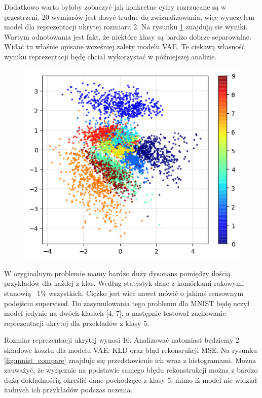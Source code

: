 Dodatkowo warto byłoby zobaczyć jak konkretne cyfry rozrzucane są w przestrzeni. 20 wymiarów jest dosyć trudne do zwizualizowania, więc wyuczyłem model dla reprezentacji ukrytej rozmiaru 2. Na rysunku \ref{fig:mnist_2d} znajdują sie wyniki. Wartym odnotowania jest fakt, że niektóre klasy są bardzo dobrze separowalne. Widać tu właśnie opisane wcześniej zalety modelu VAE. Te ciekawą własność wyniku reprezentacji będę chciał wykorzystać w późniejszej analizie.

\begin{figure}[h!]
    \centering
    \includegraphics[width=1.\textwidth]{images/mnist_2d}
    \caption{}
    \label{fig:mnist_2d}
\end{figure}

W oryginalnym problemie mamy bardzo duży dysonans pomiędzy ilością przykładów dla każdej z klas. Według statystyk dane z komórkami rakowymi stanowią ~1\% wszystkich. Ciężko jest wiec nawet mówić o jakimś sensownym podejściu supervised. Do zasymulowania tego problemu dla MNIST będę uczył model jedynie na dwóch klasach [4, 7], a następnie testował zachowanie reprezentacji ukrytej dla przekładów z klasy 5.

Rozmiar reprezentacji ukrytej wynosi 10. Analizować natomiast będziemy 2 składowe kosztu dla modelu VAE: KLD oraz błąd rekonsrukcji MSE. Na rysunku \ref{fig:mnist_compare} znajduje się przedstawienie ich wraz z histogramami. Można zauważyć, że wyłącznie na podstawie samego błędu rekonstrukcji można z bardzo dużą dokładnością określić dane pochodzące z klasy 5, mimo iż model nie widział żadnych ich przykładów podczas uczenia.

